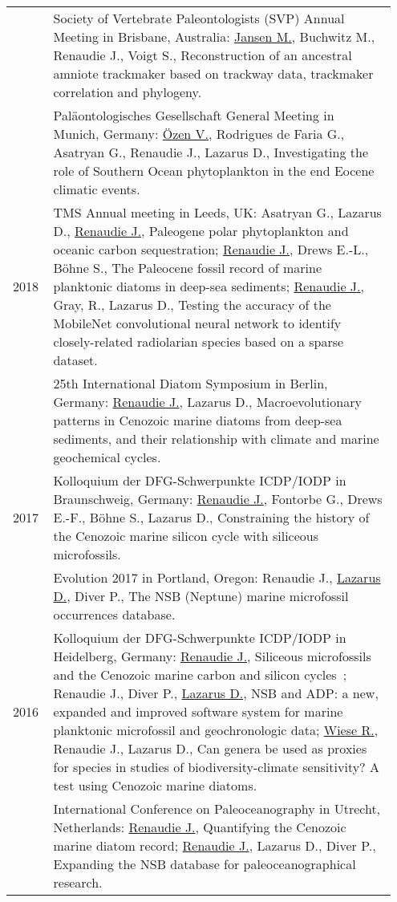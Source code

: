 \documentclass[11pt, a4paper]{article}
\begin{document}
\begin{longtable}{@{}p{0.1\linewidth} P{0.85\linewidth}@{}}
& Society of Vertebrate Paleontologists (SVP) Annual Meeting in Brisbane, Australia: \underline{Jansen M.}, Buchwitz M., Renaudie J., Voigt S., Reconstruction of an ancestral amniote trackmaker based on trackway data, trackmaker correlation and phylogeny.\\
& Paläontologisches Gesellschaft General Meeting in Munich, Germany: \underline{\"{O}zen V.}, Rodrigues de Faria G., Asatryan G., Renaudie J., Lazarus D., Investigating the role of Southern Ocean phytoplankton in the end Eocene climatic events.\\
2018 & TMS Annual meeting in Leeds, UK: Asatryan G., Lazarus D., \underline{Renaudie J.}, Paleogene polar phytoplankton and oceanic carbon sequestration; \underline{Renaudie J.}, Drews E.-L., Böhne S., The Paleocene fossil record of marine planktonic diatoms in deep-sea sediments; \underline{Renaudie J.}, Gray, R., Lazarus D., Testing the accuracy of the MobileNet convolutional neural network to identify closely-related radiolarian species based on a sparse dataset.\\
& 25th International Diatom Symposium in Berlin, Germany: \underline{Renaudie J.}, Lazarus D., Macroevolutionary patterns in Cenozoic marine diatoms from deep-sea sediments, and their relationship with climate and marine geochemical cycles.\\
2017 & Kolloquium der DFG-Schwerpunkte ICDP/IODP in Braunschweig, Germany: \underline{Renaudie J.}, Fontorbe G., Drews E.-F., Böhne S., Lazarus D., Constraining the history of the Cenozoic marine silicon cycle with siliceous microfossils.\\
& Evolution 2017 in Portland, Oregon: Renaudie J., \underline{Lazarus D.}, Diver P., The NSB (Neptune) marine microfossil occurrences database.\\
2016 & Kolloquium der DFG-Schwerpunkte ICDP/IODP in Heidelberg, Germany: \underline{Renaudie J.}, Siliceous microfossils and the Cenozoic marine carbon and silicon cycles ; Renaudie J., Diver P., \underline{Lazarus D.}, NSB and ADP: a new, expanded and improved software system for marine planktonic microfossil and geochronologic data; \underline{Wiese R.}, Renaudie J., Lazarus D., Can genera be used as proxies for species in studies of biodiversity-climate sensitivity? A test using Cenozoic marine diatoms.\\
 & International Conference on Paleoceanography in Utrecht, Netherlands: \underline{Renaudie J.}, Quantifying the Cenozoic marine diatom record; \underline{Renaudie J.}, Lazarus D., Diver P., Expanding the NSB database for paleoceanographical research.\\

\end{longtable}
\end{document}
